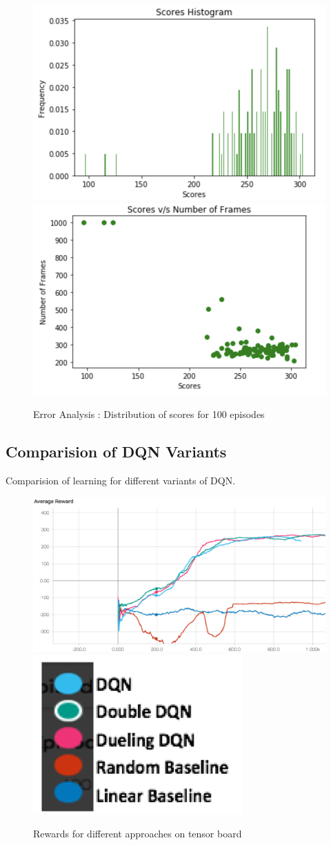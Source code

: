 \begin{figure}[!ht]
\centering
\includegraphics[scale=0.50,width=0.50\columnwidth]{figures/Histogram.png}%
\includegraphics[scale=0.50,width=0.50\columnwidth]{figures/Frames.png}%
\caption{ Error Analysis : Distribution of scores for 100 episodes }%
\label{fig:Error Analysis}%
\end{figure}

\subsection{ Comparision of DQN Variants}

Comparision of learning for different variants of DQN. 
 
\begin{figure}[!ht]
\centering
\includegraphics[scale=0.75,width=0.75\columnwidth]{figures/Picture1.png}%
\includegraphics[scale=0.15,width=0.15\columnwidth]{figures/Legend.png}%
\caption{ Rewards for different approaches on tensor board}%
\label{fig:Visualization}%
\end{figure}

